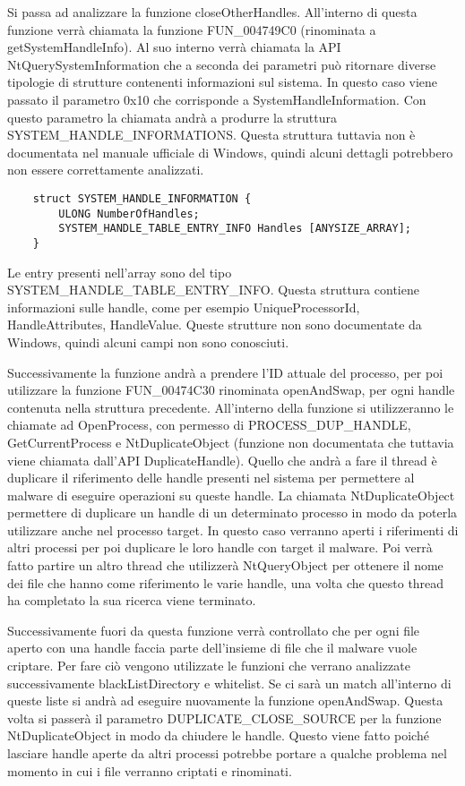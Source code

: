 \documentclass[a4paper,12pt]{article}
\begin{document}
Si passa ad analizzare la funzione closeOtherHandles. All'interno di questa funzione verrà chiamata la funzione FUN\_004749C0 (rinominata a getSystemHandleInfo). Al suo interno verrà chiamata la API NtQuerySystemInformation che a seconda dei parametri può ritornare diverse tipologie di strutture contenenti informazioni sul sistema. In questo caso viene passato il parametro 0x10 che corrisponde a SystemHandleInformation. Con questo parametro la chiamata andrà a produrre la struttura \\SYSTEM\_HANDLE\_INFORMATIONS. Questa struttura tuttavia non è documentata nel manuale ufficiale di Windows, quindi alcuni dettagli potrebbero non essere correttamente analizzati.
\begin{verbatim}
	struct SYSTEM_HANDLE_INFORMATION {
		ULONG NumberOfHandles;
		SYSTEM_HANDLE_TABLE_ENTRY_INFO Handles [ANYSIZE_ARRAY];
	}
\end{verbatim}

Le entry presenti nell'array sono del tipo \\SYSTEM\_HANDLE\_TABLE\_ENTRY\_INFO. Questa struttura contiene informazioni sulle handle, come per esempio UniqueProcessorId, HandleAttributes, HandleValue. Queste strutture non sono documentate da Windows, quindi alcuni campi non sono conosciuti. 

Successivamente la funzione andrà a prendere l'ID attuale del processo, per poi utilizzare la funzione FUN\_00474C30 rinominata openAndSwap, per ogni handle contenuta nella struttura precedente. All'interno della funzione si utilizzeranno le chiamate ad OpenProcess, con permesso di PROCESS\_DUP\_HANDLE, GetCurrentProcess e NtDuplicateObject (funzione non documentata che tuttavia viene chiamata dall'API DuplicateHandle). Quello che andrà a fare il thread è duplicare il riferimento delle handle presenti nel sistema per permettere al malware di eseguire operazioni su queste handle. La chiamata NtDuplicateObject permettere di duplicare un handle di un determinato processo in modo da poterla utilizzare anche nel processo target. In questo caso verranno aperti i riferimenti di altri processi per poi duplicare le loro handle con target il malware.  Poi verrà fatto partire un altro thread che utilizzerà NtQueryObject per ottenere il nome dei file che hanno come riferimento le varie handle, una volta che questo thread ha completato la sua ricerca viene terminato.

Successivamente fuori da questa funzione verrà controllato che per ogni file aperto con una handle faccia parte dell'insieme di file che il malware vuole criptare. Per fare ciò vengono utilizzate le funzioni che verrano analizzate successivamente blackListDirectory e whitelist. Se ci sarà un match all'interno di queste liste si andrà ad eseguire nuovamente la funzione openAndSwap. Questa volta si passerà il parametro DUPLICATE\_CLOSE\_SOURCE per la funzione NtDuplicateObject in modo da chiudere le handle. Questo viene fatto poiché lasciare handle aperte da altri processi potrebbe portare a qualche problema nel momento in cui i file verranno criptati e rinominati.
\end{document}
